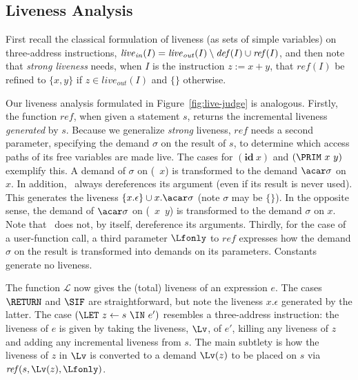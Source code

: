 \documentclass{llncs}
\newcommand{\ID}{\mbox{$\mathbf{ id}$}} %
\begin{document}
\subsection{Liveness Analysis}
First recall the classical formulation of liveness (as sets of simple variables)
on three-address instructions,
$
\mathit{live}_\mathit{in}(I) = \mathit{live}_\mathit{out}(I)
     \setminus \mathit{def\/}(I)
     \cup   \mathit{ref\/}(I)
$,
and then note that {\em strong liveness} needs, when $I$ is the instruction $z:=x+y$,
that $\mathit{ref}(I)$ be refined to
$\{x,y\}$ if $z \in\mathit{live}_\mathit{out}(I)$ and $\{\}$ otherwise.

Our liveness analysis formulated in Figure~\ref{fig:live-judge}
is analogous.
Firstly, the function $\mathit{ref}$, when given a statement $s$,
returns the incremental liveness {\em generated} by $s$.
Because we generalize {\em strong} liveness, $\mathit{ref}$ needs a second parameter,
specifying the demand $\sigma$ on the result of $s$,
to determine which access paths of its free variables are made live.
The cases for $(\ID\ x)$ and $(\PRIM\ x\ y)$ exemplify this.
A demand  of  $\sigma$  on  (\CAR~$x$)  is  transformed  to  the  demand
$\acar\sigma$  on  $x$.   In  addition, \CAR\  always  dereferences  its
argument (even if its result is never used).
This generates the liveness  $\{x.\epsilon\} \cup  x.\acar\sigma$
(note $\sigma$ may be $\{\}$).
In the opposite  sense, the  demand  of $\acar\sigma$  on
(\CONS~$x$~$y$) is  transformed to the  demand $\sigma$ on  $x$.  Note
that \CONS\ does not, by itself, dereference its arguments.
Thirdly, for the case of a user-function call, a third parameter $\Lfonly$ to 
$\mathit{ref}$
expresses how the demand $\sigma$ on the result is transformed into demands on its parameters.
Constants generate no liveness.

The function $\mathcal{L}$ now gives the (total) liveness of an expression $e$.
The cases $\RETURN$ and $\SIF$ are straightforward, but note the liveness $x.\epsilon$ generated
by the latter.
The case $(\LET\ z\leftarrow s\ \IN\ e')$
resembles a three-address instruction:
the liveness of $e$ is given by taking the liveness, $\Lv$, of $e'$,
killing any liveness of $z$ and adding any incremental liveness from $s$.
The main subtlety is how the liveness of $z$ in $\Lv$ is converted to a demand $\Lv(z)$ to be
placed on $s$ via $\mathit{ref}(s,\Lv(z),\Lfonly)$.
\end{document}
